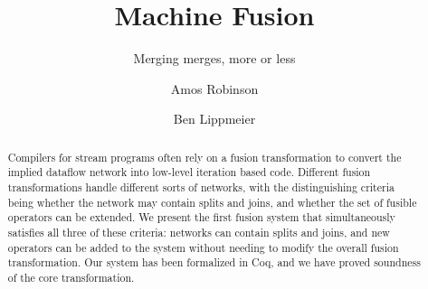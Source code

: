 \documentclass[acmlarge,review,anonymous]{acmart}\settopmatter{printfolios=true}
\begin{document}
\title{Machine Fusion}
\subtitle{Merging merges, more or less}

\author{Amos Robinson}

\author{Ben Lippmeier}

\makeatactive
\begin{abstract}
Compilers for stream programs often rely on a fusion transformation to convert the implied dataflow network into low-level iteration based code. Different fusion transformations handle different sorts of networks, with the distinguishing criteria being whether the network may contain splits and joins, and whether the set of fusible operators can be extended. We present the first fusion system that simultaneously satisfies all three of these criteria: networks can contain splits and joins, and new operators can be added to the system without needing to modify the overall fusion transformation. Our system has been formalized in Coq, and we have proved soundness of the core transformation.
\end{abstract}


\maketitle











\clearpage{}

\end{document}
